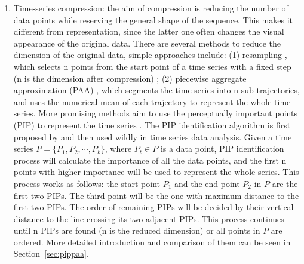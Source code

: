 \begin{enumerate}
    \item Time-series compression: the aim of compression is reducing the number of data points while reserving the general shape of the sequence. This makes it  different from representation, since the latter one often changes the visual appearance of the original data. There are several methods to reduce the dimension of the original data, simple approaches include: (1) resampling \cite{aastrom1969choice}, which selects n points from the start point of a time series with a fixed step (n is the dimension after compression) ; (2) piecewise aggregate approximation (PAA) \cite{keogh2001dimensionality,yi2000fast}, which segments the time series into n sub trajectories, and uses the numerical mean of each trajectory to represent the whole time series. More promising methods aim to use the perceptually important points (PIP) to represent the time series \cite{fu2011review}. The PIP identification algorithm is first proposed by \cite{chung2001flexible} and then used wildly in time series data analysis. Given a time series $ P = \{P_1, P_2, \cdots, P_k\}$, where $P_t \in P$ is a data point, PIP identification process will calculate the importance of all the data points, and the first n points with higher importance will be used to represent the whole series. This process works as follows: the start point $P_1$ and the end point $P_2$ in $P$ are the first two PIPs. The third point will be the one with maximum distance to the first two PIPs. The order of remaining PIPs will be decided by their vertical distance to the line crossing its two adjacent PIPs. This process continues until n PIPs are found (n is the reduced dimension) or all points in $P$ are ordered. More detailed introduction and comparison of them can be seen in Section~\ref{sec:pippaa}.

\end{enumerate}
